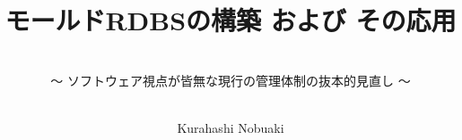 
\titlehead{\hfill\small\customdate}

\subject{\Large--- マシニングによるモールド加工 ---}

\title{\huge モールドRDBSの構築 および その応用}

\subtitle{\ \\\normalsize～ ソフトウェア視点が皆無な現行の管理体制の抜本的見直し ～}

\date{}

\publishers{}

\author{\ \\\small Kurahashi Nobuaki}

\uppertitleback{\small
This document was created using \TeX{} (\linkLaTeX\kern.15em2$_{\textstyle\varepsilon}$), specifically utilizing tools such as \linkTeXLive{} 2023, up\LaTeX, \linkBibLaTeX\ (\linkBiber), \linkPGFTikZ, and many useful packages, and \linkTeXStudio.\\
Numerical calculations were performed using \linkExcel{} and \linkPython.\\
The source codes for the G-code programs were written using \linkVSCode.\\
Version control for these documents was managed using \linkGitHub.\\
The environment for these tools was managed using \linkDocker{} and \linkUbuntu.\\
The database used was \linkSQLite.\\
Thanks to these tools, with the all-around support of  (\linkBingChat), the creation of this document and system was made possible.
}

